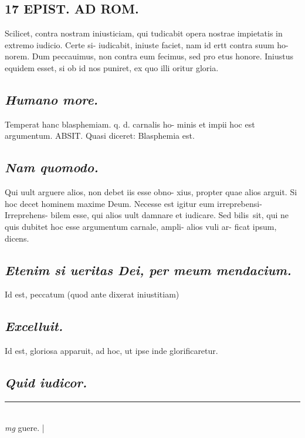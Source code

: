 \documentclass{article}
\begin{document}
\begin{pages}
\section*{17 EPIST. AD ROM.  }
\marginpar{[ p.]}\pstart Scilicet, contra nostram iniusticiam, qui tudicabit opera nostrae impietatis in extremo iudicio. Certe si- iudicabit, iniuste faciet, nam id ertt contra suum ho- norem. Dum peccauimus, non contra eum fecimus, sed pro etus honore. Iniustus equidem esset, si ob id nos puniret, ex quo illi oritur gloria.   \pend
{}
{}
\subsection*{\textit{Humano more. }}\pstart Temperat hanc blasphemiam. q. d. carnalis ho- minis et impii hoc est argumentum. ABSIT.  Quasi diceret: Blasphemia est.  \pend
{}
{}
\subsection*{\textit{Nam quomodo. }}\pstart Qui uult arguere alios, non debet iis esse obno- xius, propter quae alios arguit. Si hoc decet hominem maxime Deum. Necesse est igitur eum irreprebensi- Irreprehens- bilem esse, qui alios uult damnare et iudicare. Sed bilis sit, qui ne quis dubitet hoc esse argumentum carnale, ampli- alios vuli ar- ficat ipsum, dicens.   \pend
{}
{}
\subsection*{\textit{Etenim si ueritas Dei, per meum mendacium. }}\pstart Id est, peccatum (quod ante dixerat iniustitiam)  \pend
{}
{}
\subsection*{\textit{Excelluit. }}\pstart Id est, gloriosa apparuit, ad hoc, ut ipse inde glorificaretur.   \pend
{}
{}
\subsection*{\textit{Quid iudicor. }}\pstart  \pend
\vspace{0.5cm}\noindent
\vspace{0.2cm}\rule{1cm}{0.2pt}\\ 
\hspace{0.2cm}\textit{mg}
\footnotesize  guere.  
\normalsize| 

\end{pages}
\end{document}
